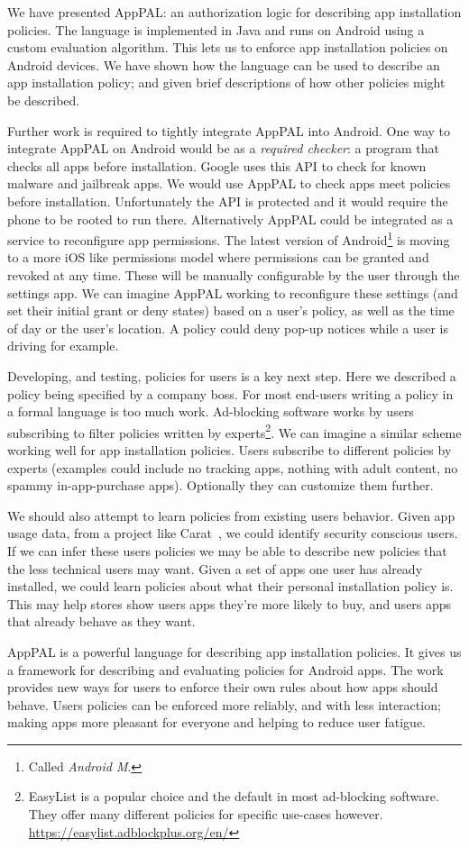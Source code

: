 \documentclass[]{scrartcl}
\begin{document}
We have presented AppPAL: an authorization logic for describing app installation policies.
The language is implemented in Java and runs on Android using a custom evaluation algorithm.
This lets us to enforce app installation policies on Android devices.
We have shown how the language can be used to describe an app installation policy;
  and given brief descriptions of how other policies might be described.

Further work is required to tightly integrate AppPAL into Android.
One way to integrate AppPAL on Android would be as a \emph{required checker}: a program that checks all apps before installation.
Google uses this API to check for known malware and jailbreak apps.
We would use AppPAL to check apps meet policies before installation.
Unfortunately the API is protected and it would require the phone to be rooted to run there.
Alternatively AppPAL could be integrated as a service to reconfigure app permissions.
The latest version of Android\footnote{Called \emph{Android M}.} is moving to a more iOS like permissions model where permissions can be granted and revoked at any time.
These will be manually configurable by the user through the settings app.
We can imagine AppPAL working to reconfigure these settings (and set their initial grant or deny states) based on a user's policy, as well as the time of day or the user's location.
A policy could deny pop-up notices while a user is driving for example.

Developing, and testing, policies for users is a key next step.
Here we described a policy being specified by a company boss.
For most end-users writing a policy in a formal language is too much work.
Ad-blocking software works by users subscribing to filter policies written by experts\footnote{EasyList is a popular choice and the default in most ad-blocking software. They offer many different policies for specific use-cases however. \url{https://easylist.adblockplus.org/en/}}.
We can imagine a similar scheme working well for app installation policies.
Users subscribe to different policies by experts (examples could include no tracking apps, nothing with adult content, no spammy in-app-purchase apps).
Optionally they can customize them further.

We should also attempt to learn policies from existing users behavior.
Given app usage data, from a project like Carat~\citep{Oliner:2013ht}, we could identify security conscious users.
If we can infer these users policies we may be able to describe new policies that the less technical users may want.
Given a set of apps one user has already installed, we could learn policies about what their personal installation policy is.
This may help stores show users apps they're more likely to buy, and users apps that already behave as they want.

AppPAL is a powerful language for describing app installation policies.
It gives us a framework for describing and evaluating policies for Android apps.
The work provides new ways for users to enforce their own rules about how apps should behave.
Users policies can be enforced more reliably, and with less interaction;
making apps more pleasant for everyone and helping to reduce user fatigue.



\end{document}
